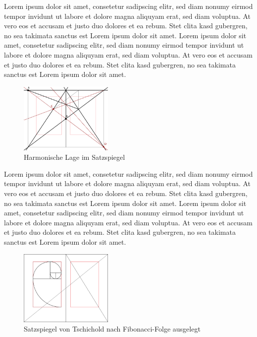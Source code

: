 \documentclass[12pt,a4paper]{article}
\begin{document}
Lorem ipsum dolor sit amet, consetetur sadipscing elitr, sed diam nonumy eirmod tempor invidunt ut labore et dolore magna aliquyam erat, sed diam voluptua. At vero eos et accusam et justo duo dolores et ea rebum. Stet clita kasd gubergren, no sea takimata sanctus est Lorem ipsum dolor sit amet. Lorem ipsum dolor sit amet, consetetur sadipscing elitr, sed diam nonumy eirmod tempor invidunt ut labore et dolore magna aliquyam erat, sed diam voluptua. At vero eos et accusam et justo duo dolores et ea rebum. Stet clita kasd gubergren, no sea takimata sanctus est Lorem ipsum dolor sit amet.

\begin{figure}
\hspace{-0.025\textwidth}
\includegraphics[width=0.4\textwidth]{Bilder/Van_de_Graaf.png}
\caption{Harmonische Lage im Satzspiegel}
\label{fig:harmVDG}
\end{figure}

Lorem ipsum dolor sit amet, consetetur sadipscing elitr, sed diam nonumy eirmod tempor invidunt ut labore et dolore magna aliquyam erat, sed diam voluptua. At vero eos et accusam et justo duo dolores et ea rebum. Stet clita kasd gubergren, no sea takimata sanctus est Lorem ipsum dolor sit amet. Lorem ipsum dolor sit amet, consetetur sadipscing elitr, sed diam nonumy eirmod tempor invidunt ut labore et dolore magna aliquyam erat, sed diam voluptua. At vero eos et accusam et justo duo dolores et ea rebum. Stet clita kasd gubergren, no sea takimata sanctus est Lorem ipsum dolor sit amet.


\begin{figure}
\hspace{-0.025\textwidth}
\includegraphics[width=0.4\textwidth]{Bilder/Golden_section_page_Tschichold.png}
\caption{Satzspiegel von Tschichold nach Fibonacci-Folge ausgelegt}
\label{fig:fibSatz}
\end{figure}
\end{document}
